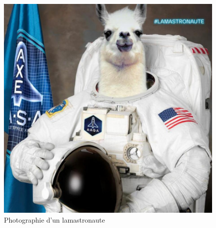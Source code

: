 \documentclass{article}
\begin{document}
\begin{figure}[H]
    \centering
    \caption{Photographie d'un lamastronaute}
    \includegraphics[scale=0.4]{lama.jpg}
\end{figure}
\end{document}
